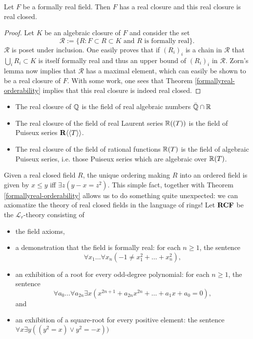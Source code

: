 \begin{proposition}
Let $F$ be a formally real field. Then $F$ has a real closure and this real closure is real closed.
\end{proposition}
\begin{proof}
Let $K$ be an algebraic closure of $F$ and consider the set $$\mathcal{R}:=\{R: F\subset R\subset K\text{ and } R \text{ is formally real} \}.$$ $\mathcal{R}$ is poset under inclusion. One easily proves that if $(R_i)_i$ is a chain in $\mathcal{R}$ that $\bigcup_i R_i\subset K$ is itself formally real and thus an upper bound of $(R_i)_i$ in $\mathcal{R}$. Zorn's lemma now implies that $\mathcal{R}$ has a maximal element, which can easily be shown to be a real closure of $F$. With some work, one sees that Theorem \ref{formallyreal-orderability} implies that this real closure is indeed real closed.
\end{proof}

\begin{example}
	\begin{itemize}
		\item The real closure of $\mathbb{Q}$ is the field of real algebraic numbers $\bar{\mathbb{Q}}\cap \mathbb{R}$
		\item The real closure of the field of real Laurent series $\mathbb{R}((T))$ is the field of Puiseux series $\mathbf{R}\langle\langle T\rangle\rangle$. 
		\item The real closure of the field of rational functions $\mathbb{R}(T)$ is the field of algebraic Puiseux series, i.e. those Puiseux series which are algebraic over $\mathbb{R}(T)$.
	\end{itemize}
\end{example}

Given a real closed field $R$, the unique ordering making $R$ into an ordered field is given by $x\leq y$ iff $\exists z (y-x=z^2)$. This simple fact, together with Theorem \ref{formallyreal-orderability} allows us to do something quite unexpected: we can axiomatize the theory of real closed fields in the language of rings! Let ${\normalfont\textbf{RCF}}$ be the $\mathcal{L}_r$-theory consisting of 
\begin{itemize}
	\item the field axioms,
	\item a demonstration that the field is formally real: for each $n\geq 1$, the sentence $$\forall x_1\dots \forall x_n(-1\neq x_1^2+\dots+x_n^2),$$
	\item an exhibition of a root for every odd-degree polynomial: for each $n\geq 1$, the sentence $$\forall a_0\dots \forall a_{2n} \exists x(x^{2n+1}+a_{2n}x^{2n}+\dots+a_1x+a_0=0),$$ and
	\item an exhibition of a square-root for every positive element: the sentence $\forall x\exists y( (y^2=x)\vee y^2=-x) )$
\end{itemize}

